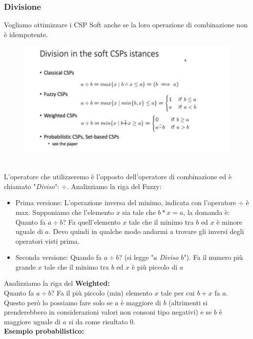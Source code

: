 \subsubsection{Divisione}
Vogliamo ottimizzare i CSP Soft anche se la loro operazione di combinazione non
è idempotente.
\begin{figure}[htp]
    \centering
    \includegraphics[width=12cm, keepaspectratio]{img/Cap5/DIvisione.png}
\end{figure}
\\L'operatore che utilizzeremo è l'opposto dell'operatore di combinazione ed è
chiamato "\textit{Diviso}": $\div$. Analizziamo la riga del Fuzzy:
\begin{itemize}
    \item Prima versione: L'operazione inversa del minimo, indicata con
          l'operatore $\div$ è max. Supponiamo che l'elemento $x$ sia tale che
          $b * x = a$, la domanda è: Quanto fa $a \div b$? Fa quell'elemento $x$
          tale che il minimo tra $b$ ed $x$ è minore uguale di $a$. Devo quindi in
          qualche modo andarmi a trovare gli inversi degli operatori visti
          prima.
    \item  Seconda versione: Quando fa $a \div b$? (si legge "\textit{$a$ Diviso $b$}"). Fa il
          numero più grande $x$ tale che il minimo tra $b$ ed $x$ è più piccolo di $a$
\end{itemize}
Analizziamo la riga del \textbf{Weighted:} \\Quanto fa $a \div b$? Fa il più
piccolo (min) elemento $x$ tale per cui $b + x$ fa $a$. Questo però lo possiamo fare
solo se $a$ è maggiore di $b$ (altrimenti si prenderebbero in considerazioni valori
non consoni tipo negativi) e se $b$ è maggiore uguale di $a$ si da come risultato 0.
\\\textbf{Esempio probabilistico:}
